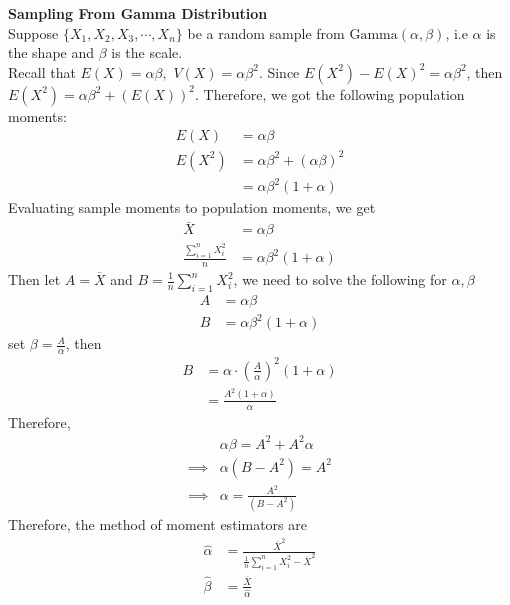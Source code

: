 \begin{ex}
\textbf{Sampling From Gamma Distribution}\\
Suppose $\{X_1,X_2,X_3,\cdots,X_n\}$ be a random sample from $\text{Gamma}(\alpha,\beta)$, i.e $\alpha$ is the shape and $\beta$ is the scale.\\
Recall that $E(X)=\alpha \beta,$ $V(X)=\alpha \beta^2$. Since $E(X^2)-E(X)^2=\alpha \beta^2$, then $E(X^2)=\alpha \beta^2+(E(X))^2$. Therefore, we got the following population moments:\begin{align*}
E(X)&=\alpha \beta\\
E(X^2)&=\alpha \beta^2+(\alpha \beta)^2\\
&=\alpha \beta^2(1+\alpha)
\end{align*}
Evaluating sample moments to population moments, we get\begin{align*}
\overline{X}&=\alpha \beta\\
\frac{\sum_{i=1}^nX_i^2}{n}&=\alpha \beta^2(1+\alpha)
\end{align*}
Then let $A=\overline{X}$ and $B=\frac{1}{n}\sum_{i=1}^nX_i^2$, we need to solve the following for $\alpha,\beta$\begin{align*}
A&=\alpha \beta\\
B&=\alpha \beta^2(1+\alpha)
\end{align*}
set $\beta =\frac{A}{\alpha}$, then \begin{align*}
B&=\alpha \cdot \left(\frac{A}{\alpha} \right)^2(1+\alpha)\\
&=\frac{A^2(1+\alpha)}{\alpha}
\end{align*}
Therefore, \begin{align*}
&\alpha \beta =A^2+A^2\alpha\\
\implies &\alpha(B-A^2)=A^2\\
\implies &\alpha =\frac{A^2}{(B-A^2)}
\end{align*}
Therefore, the method of moment estimators are \begin{align*}
\widehat{\alpha}&=\frac{\overline{X}^2}{\frac{1}{n}\sum_{i=1}^nX_i^2-\overline{X}^2}\\
\widehat{\beta}&=\frac{\overline{X}}{\widehat{\alpha}}
\end{align*}
\end{ex}
